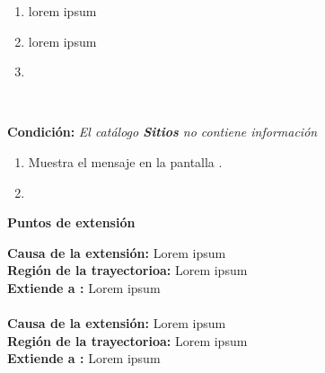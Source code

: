 \begin{enumerate}[{C-}1.]

	\item \actor lorem ipsum
	\item \sistema lorem ipsum
	\item \finTA	

\end{enumerate}

\begin{large}
	\\
\end{large}	
\textbf{Condición:} \textit{El catálogo \textbf{Sitios} no contiene información}

\begin{enumerate}[{D-}1.]

	\item \sistema Muestra el mensaje  en la pantalla .
	\item \finCU	

\end{enumerate}


\begin{large}
	\textbf{Puntos de extensión}\\
\end{large}	

\textbf{Causa de la extensión:} Lorem ipsum\\
\textbf{Región de la trayectorioa:} Lorem ipsum\\
\textbf{Extiende a :} Lorem ipsum\\\\

\textbf{Causa de la extensión:} Lorem ipsum\\
\textbf{Región de la trayectorioa:} Lorem ipsum\\
\textbf{Extiende a :} Lorem ipsum\\

